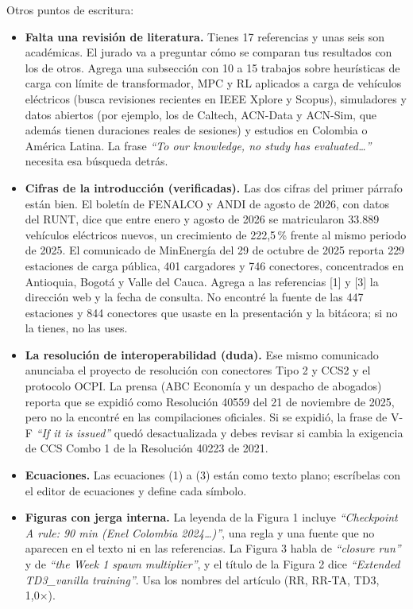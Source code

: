 \documentclass[11pt]{article}
\begin{document}
Otros puntos de escritura:
\begin{itemize}[leftmargin=1.2em]
\item \textbf{Falta una revisión de literatura.} Tienes 17 referencias y unas seis son académicas. El jurado va a preguntar cómo se comparan tus resultados con los de otros. Agrega una subsección con 10 a 15 trabajos sobre heurísticas de carga con límite de transformador, MPC y RL aplicados a carga de vehículos eléctricos (busca revisiones recientes en IEEE Xplore y Scopus), simuladores y datos abiertos (por ejemplo, los de Caltech, ACN-Data y ACN-Sim, que además tienen duraciones reales de sesiones) y estudios en Colombia o América Latina. La frase \foreignlanguage{english}{\emph{``To our knowledge, no study has evaluated\ldots''}} necesita esa búsqueda detrás.
\item \textbf{Cifras de la introducción (verificadas).} Las dos cifras del primer párrafo están bien. El boletín de FENALCO y ANDI de agosto de 2026, con datos del RUNT, dice que entre enero y agosto de 2026 se matricularon 33.889 vehículos eléctricos nuevos, un crecimiento de 222,5\,\% frente al mismo periodo de 2025. El comunicado de MinEnergía del 29 de octubre de 2025 reporta 229 estaciones de carga pública, 401 cargadores y 746 conectores, concentrados en Antioquia, Bogotá y Valle del Cauca. Agrega a las referencias [1] y [3] la dirección web y la fecha de consulta. No encontré la fuente de las 447 estaciones y 844 conectores que usaste en la presentación y la bitácora; si no la tienes, no las uses.
\item \textbf{La resolución de interoperabilidad (duda).} Ese mismo comunicado anunciaba el proyecto de resolución con conectores Tipo 2 y CCS2 y el protocolo OCPI. La prensa (ABC Economía y un despacho de abogados) reporta que se expidió como Resolución 40559 del 21 de noviembre de 2025, pero no la encontré en las compilaciones oficiales. Si se expidió, la frase de V-F \foreignlanguage{english}{\emph{``If it is issued''}} quedó desactualizada y debes revisar si cambia la exigencia de CCS Combo 1 de la Resolución 40223 de 2021.
\item \textbf{Ecuaciones.} Las ecuaciones (1) a (3) están como texto plano; escríbelas con el editor de ecuaciones y define cada símbolo.
\item \textbf{Figuras con jerga interna.} La leyenda de la Figura 1 incluye \foreignlanguage{english}{\emph{``Checkpoint A rule: 90 min (Enel Colombia 2024\ldots)''}}, una regla y una fuente que no aparecen en el texto ni en las referencias. La Figura 3 habla de \foreignlanguage{english}{\emph{``closure run''}} y de \foreignlanguage{english}{\emph{``the Week 1 spawn multiplier''}}, y el título de la Figura 2 dice \foreignlanguage{english}{\emph{``Extended TD3\_vanilla training''}}. Usa los nombres del artículo (RR, RR-TA, TD3, 1,0×).
\end{itemize}
\end{document}

